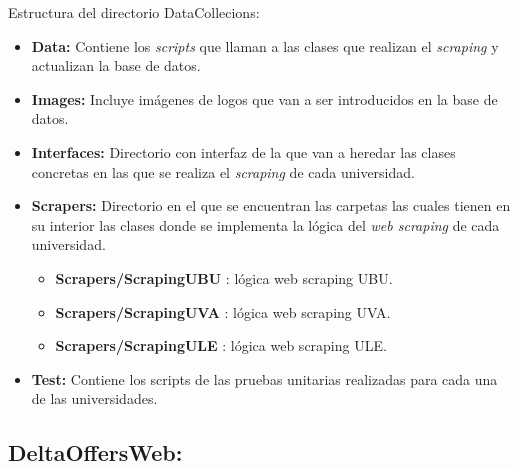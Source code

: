Estructura del directorio DataCollecions:
\begin{itemize}
    \item \textbf{Data:} Contiene los \textit{scripts} que llaman a las clases que realizan el \textit{scraping} y actualizan la base de datos.
    \item \textbf{Images:} Incluye imágenes de logos que van a ser introducidos en la base de datos.
    \item \textbf{Interfaces:} Directorio con interfaz de la que van a heredar las clases concretas en las que se realiza el \textit{scraping} de cada universidad.
    \item \textbf{Scrapers:} Directorio en el que se encuentran las carpetas las cuales tienen en su interior las clases donde se implementa la lógica del \textit{web scraping} de cada universidad.
    \begin{itemize}
        \item \textbf{Scrapers/ScrapingUBU} : lógica web scraping UBU.
        \item \textbf{Scrapers/ScrapingUVA} : lógica web scraping UVA.
        \item \textbf{Scrapers/ScrapingULE} : lógica web scraping ULE.
    \end{itemize}
    \item \textbf{Test:} Contiene los scripts de las pruebas unitarias realizadas para cada una de las universidades.
\end{itemize}

\subsection{DeltaOffersWeb:}

